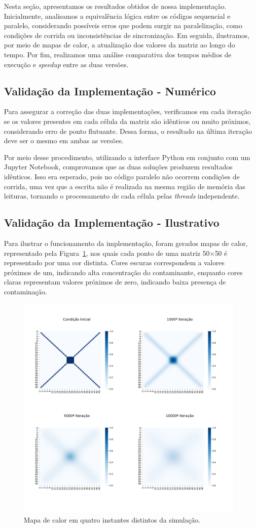 \documentclass[12pt]{article}
\begin{document}
Nesta seção, apresentamos os resultados obtidos de nossa implementação.
Inicialmente, analisamos a equivalência lógica entre os códigos sequencial e
paralelo, considerando possíveis erros que podem surgir na paralelização, como
condições de corrida ou inconsistências de sincronização. Em seguida,
ilustramos, por meio de mapas de calor, a atualização dos valores da matriz ao
longo do tempo. Por fim, realizamos uma análise comparativa dos tempos médios
de execução e \textit{speedup} entre as duas versões.

\subsection{Validação da Implementação - Numérico}

Para assegurar a correção das duas implementações, verificamos em cada iteração
se os valores presentes em cada célula da matriz são idênticos ou muito
próximos, considerando erro de ponto flutuante. Dessa forma, o resultado na
última iteração deve ser o mesmo em ambas as versões.

Por meio desse procedimento, utilizando a interface Python em conjunto com um
Jupyter Notebook, comprovamos que as duas soluções produzem resultados
idênticos. Isso era esperado, pois no código paralelo não ocorrem condições de
corrida, uma vez que a escrita não é realizada na mesma região de memória das
leituras, tornando o processamento de cada célula pelas \textit{threads}
independente.

\subsection{Validação da Implementação - Ilustrativo}

Para ilustrar o funcionamento da implementação, foram gerados mapas de calor,
representado pela Figura~\ref{fig:heatmap}, nos quais cada ponto de uma matriz
50$\times$50 é representado por uma cor distinta. Cores escuras correspondem a
valores próximos de um, indicando alta concentração do contaminante, enquanto
cores claras representam valores próximos de zero, indicando baixa presença de
contaminação.

\begin{figure}[ht]
  \centering
  \includegraphics[width=.45\textwidth]{figs/heatmap.png}
  \caption{Mapa de calor em quatro instantes distintos da simulação.}\label{fig:heatmap}
\end{figure}
\end{document}
